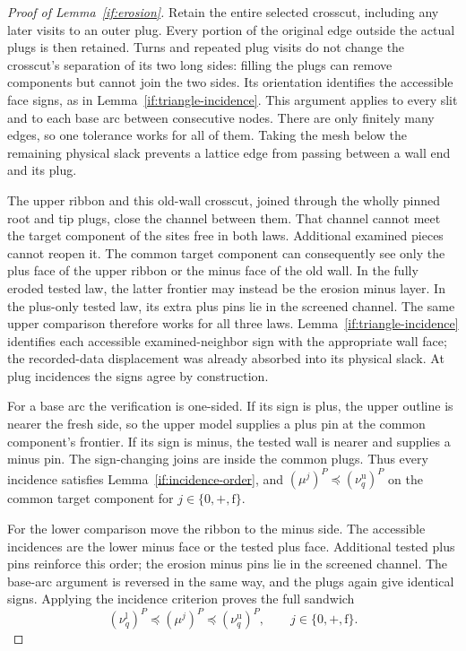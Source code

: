 \begin{proof}[Proof of Lemma~\ref{if:erosion}]
Retain the entire selected crosscut, including any later visits to
an outer plug. Every portion of the original edge outside the actual
plugs is then retained. Turns and repeated plug visits do not change
the crosscut's separation of its two long sides: filling the plugs
can remove components but cannot join the two sides. Its orientation
identifies the accessible face signs, as in
Lemma~\ref{if:triangle-incidence}. This argument applies to every
slit and to each base arc between consecutive nodes. There are only
finitely many edges, so one tolerance works for all of them. Taking
the mesh below the remaining physical slack prevents a lattice edge
from passing between a wall end and its plug.

The upper ribbon and this old-wall crosscut, joined through the
wholly pinned root and tip plugs, close the channel between them.
That channel cannot meet the target component of the sites free in
both laws. Additional examined pieces cannot reopen it. The common
target component can consequently see only the plus face of the
upper ribbon or the minus face of the old wall. In the fully eroded
tested law, the latter frontier may instead be the erosion minus
layer. In the plus-only tested law, its extra plus pins lie in the
screened channel. The same upper comparison therefore works for
all three laws. Lemma~\ref{if:triangle-incidence} identifies each
accessible examined-neighbor sign with the appropriate wall face;
the recorded-data displacement was already absorbed into its
physical slack. At plug incidences the signs agree by construction.

For a base arc the verification is one-sided. If its sign is plus,
the upper outline is nearer the fresh side, so the upper model
supplies a plus pin at the common component's frontier. If its sign
is minus, the tested wall is nearer and supplies a minus pin. The
sign-changing joins are inside the common plugs. Thus every
incidence satisfies Lemma~\ref{if:incidence-order}, and
$ (\mu^j)^P\preceq(\nu_q^{\mathrm u})^P$ on the common target
component for $j\in\{0,+,\mathrm f\}$.

For the lower comparison move the ribbon to the minus side. The
accessible incidences are the lower minus face or the tested plus
face. Additional tested plus pins reinforce this order; the erosion
minus pins lie in the screened channel. The base-arc argument is
reversed in the same way, and the plugs again give identical signs.
Applying the incidence criterion proves the full sandwich
\begin{equation}\label{if:plugged-sandwich}
 (\nu_q^{\mathrm l})^P
       \preceq (\mu^j)^P
       \preceq (\nu_q^{\mathrm u})^P,
            \qquad j\in\{0,+,\mathrm f\}.
\end{equation}


\end{proof}
